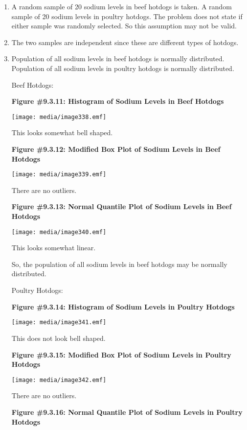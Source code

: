\documentclass[]{book}
\begin{document}
\begin{enumerate}
\def\labelenumi{\alph{enumi}.}
\item
  A random sample of 20 sodium levels in beef hotdogs is taken. A
  random sample of 20 sodium levels in poultry hotdogs. The problem
  does not state if either sample was randomly selected. So this
  assumption may not be valid.
\item
  The two samples are independent since these are different types of
  hotdogs.
\item
  Population of all sodium levels in beef hotdogs is normally
  distributed. Population of all sodium levels in poultry hotdogs is
  normally distributed.

  Beef Hotdogs:

  \textbf{Figure \#9.3.11: Histogram of Sodium Levels in Beef Hotdogs}

  \texttt{[image: media/image338.emf]}

  This looks somewhat bell shaped.

  \textbf{Figure \#9.3.12: Modified Box Plot of Sodium Levels in Beef
  Hotdogs}

  \texttt{[image: media/image339.emf]}

  There are no outliers.

  \textbf{Figure \#9.3.13: Normal Quantile Plot of Sodium Levels in Beef
  Hotdogs}

  \texttt{[image: media/image340.emf]}

  This looks somewhat linear.

  So, the population of all sodium levels in beef hotdogs may be
  normally distributed.

  Poultry Hotdogs:

  \textbf{Figure \#9.3.14: Histogram of Sodium Levels in Poultry Hotdogs}

  \texttt{[image: media/image341.emf]}

  This does not look bell shaped.

  \textbf{Figure \#9.3.15: Modified Box Plot of Sodium Levels in Poultry
  Hotdogs}

  \texttt{[image: media/image342.emf]}

  There are no outliers.

  \textbf{Figure \#9.3.16: Normal Quantile Plot of Sodium Levels in Poultry
  Hotdogs}


\end{enumerate}
\end{document}
